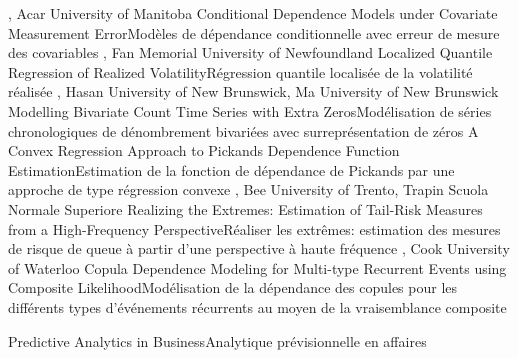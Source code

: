 {
,  {Acar}
{University of Manitoba}
}
{Conditional Dependence Models under Covariate Measurement Error}{Modèles de dépendance conditionnelle avec erreur de mesure des covariables}
{\bubbleE \enspace \screenE}
{
,  {Fan}
{Memorial University of Newfoundland}
}
{Localized Quantile Regression of Realized Volatility}{Régression quantile localisée de la volatilité réalisée}
{\bubbleE \enspace \screenE}
{
,  {Hasan}
{University of New Brunswick},  {Ma}
{University of New Brunswick}
}
{Modelling Bivariate Count Time Series with Extra Zeros}{Modélisation de séries chronologiques de dénombrement bivariées avec surreprésentation de zéros }
{\bubbleE \enspace \screenE}
{
}
{A Convex Regression Approach to Pickands Dependence Function Estimation}{Estimation de la fonction de dépendance de Pickands par une approche de type régression convexe}
{\bubbleE \enspace \screenE}
{
,  {Bee}
{University of Trento},  {Trapin}
{Scuola Normale Superiore}
}
{Realizing the Extremes: Estimation of Tail-Risk Measures from a High-Frequency Perspective}{Réaliser les extrêmes: estimation des mesures de risque de queue à partir d'une perspective à haute fréquence}
{\bubbleE \enspace \screenE}
{
,  {Cook}
{University of Waterloo}
}
{Copula Dependence Modeling for Multi-type Recurrent Events using Composite Likelihood}{Modélisation de la dépendance des copules pour les différents types d’événements récurrents au moyen de la vraisemblance composite}
{\bubbleE \enspace \screenE}





{
}
{Predictive Analytics in Business}{Analytique prévisionnelle en affaires}
{\bubbleE \enspace \screenE}

